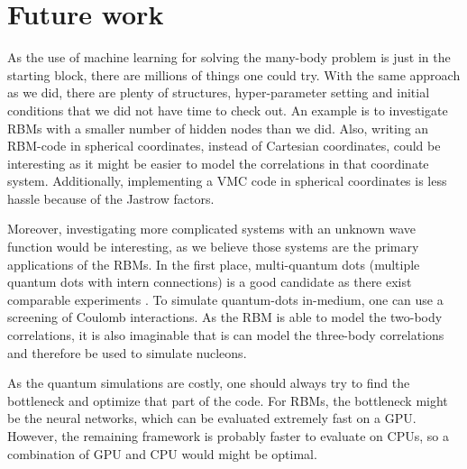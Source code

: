 \section*{Future work}
As the use of machine learning for solving the many-body problem is just in the starting block, there are millions of things one could try. With the same approach as we did, there are plenty of structures, hyper-parameter setting and initial conditions that we did not have time to check out. An example is to investigate RBMs with a smaller number of hidden nodes than we did. Also, writing an RBM-code in spherical coordinates, instead of Cartesian coordinates, could be interesting as it might be easier to model the correlations in that coordinate system. Additionally, implementing a VMC code in spherical coordinates is less hassle because of the Jastrow factors. 

Moreover, investigating more complicated systems with an unknown wave function would be interesting, as we believe those systems are the primary applications of the RBMs. In the first place, multi-quantum dots (multiple quantum dots with intern connections) is a good candidate as there exist comparable experiments \cite{marzin_photoluminescence_1994,brunner_sharp-line_1994}. To simulate quantum-dots in-medium, one can use a screening of Coulomb interactions. As the RBM is able to model the two-body correlations, it is also imaginable that is can model the three-body correlations and therefore be used to simulate nucleons.

As the quantum simulations are costly, one should always try to find the bottleneck and optimize that part of the code. For RBMs, the bottleneck might be the neural networks, which can be evaluated extremely fast on a GPU. However, the remaining framework is probably faster to evaluate on CPUs, so a combination of GPU and CPU would might be optimal.